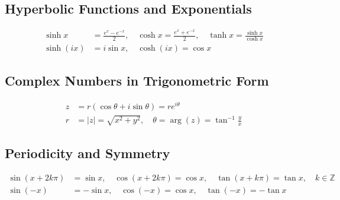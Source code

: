 \documentclass[10pt, letterpaper]{report}
\begin{document}
\subsection*{Hyperbolic Functions and Exponentials}
\begin{align*}
\sinh x &= \frac{e^x - e^{-x}}{2},\quad \cosh x = \frac{e^x + e^{-x}}{2},\quad \tanh x = \frac{\sinh x}{\cosh x} \\[6pt]
\sinh(ix) &= i\sin x,\quad \cosh(ix) = \cos x
\end{align*}

\subsection*{Complex Numbers in Trigonometric Form}
\begin{align*}
z &= r(\cos\theta+i\sin\theta)=re^{i\theta}\\[6pt]
r &= |z|=\sqrt{x^2+y^2},\quad \theta=\arg(z)=\tan^{-1}\frac{y}{x}
\end{align*}

\subsection*{Periodicity and Symmetry}
\begin{align*}
\sin(x+2k\pi)&=\sin x,\quad \cos(x+2k\pi)=\cos x,\quad \tan(x+k\pi)=\tan x,\quad k\in\mathbb{Z}\\[6pt]
\sin(-x)&=-\sin x,\quad \cos(-x)=\cos x,\quad \tan(-x)=-\tan x
\end{align*}
\end{document}
